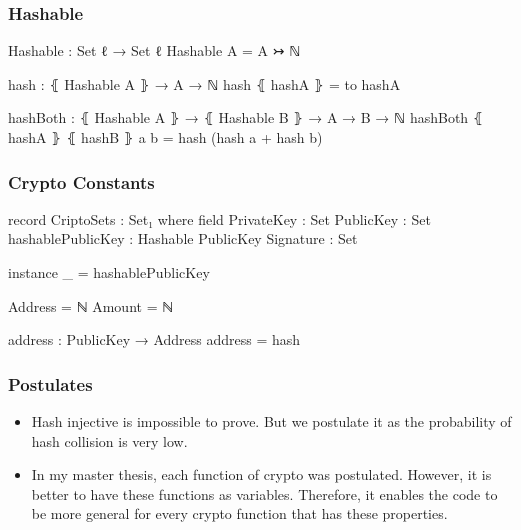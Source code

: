 \documentclass{beamer}
\begin{document}

\begin{frame}
  \frametitle{Hashable}
\begin{code}
Hashable : Set ℓ → Set ℓ
Hashable A = A ↣ ℕ
\end{code}


\begin{code}
hash : ⦃ Hashable A ⦄ → A → ℕ
hash ⦃ hashA ⦄ = to hashA

hashBoth : ⦃ Hashable A ⦄ → ⦃ Hashable B ⦄ → A → B → ℕ
hashBoth ⦃ hashA ⦄ ⦃ hashB ⦄ a b = hash (hash a + hash b)
\end{code}


\end{frame}


\begin{frame}
  \frametitle{Crypto Constants}
\begin{code}
record CriptoSets : Set₁ where
  field
    PrivateKey         : Set
    PublicKey          : Set
    hashablePublicKey  : Hashable PublicKey
    Signature          : Set

  instance
    _ = hashablePublicKey

  Address = ℕ
  Amount  = ℕ

  address : PublicKey → Address
  address = hash
\end{code}

\end{frame}

\begin{frame}
  \frametitle{Postulates}
  \begin{itemize}[<+->]
    \item Hash injective is impossible to prove.
      But we postulate it as the probability of hash collision is very low.
    \item In my master thesis, each function of crypto was postulated.
      However, it is better to have these functions as variables.
      Therefore, it enables the code to be more general for every crypto function that has these properties.
  \end{itemize}
\end{frame}
\end{document}
